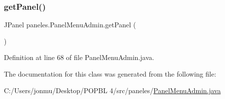 \subsubsection{\texorpdfstring{get\+Panel()}{getPanel()}}
{\footnotesize\ttfamily J\+Panel paneles.\+Panel\+Menu\+Admin.\+get\+Panel (\begin{DoxyParamCaption}{ }\end{DoxyParamCaption})}



Definition at line 68 of file Panel\+Menu\+Admin.\+java.



The documentation for this class was generated from the following file\+:\begin{DoxyCompactItemize}
\item 
C\+:/\+Users/jonmu/\+Desktop/\+P\+O\+P\+B\+L 4/src/paneles/\mbox{\hyperlink{_panel_menu_admin_8java}{Panel\+Menu\+Admin.\+java}}\end{DoxyCompactItemize}
